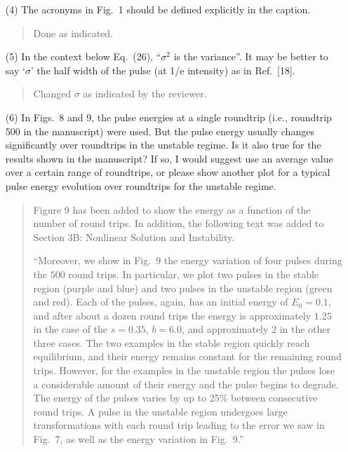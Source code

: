 \documentclass[12pt,twoside,letterpaper]{article}
\begin{document}
\begin{itemize}
    \item[{(4)}]
    The acronyms in Fig.~1 should be defined explicitly in the caption.

    \begin{quote}
        Done as indicated.
    \end{quote}

    \item[{(5)}]
    In the context below Eq.~(26), ``$\sigma^2$ is the variance''. It may be better to say `$\sigma$' the half width of the pulse (at 1/e intensity) as in  Ref.~[18].

    \begin{quote}
        Changed $\sigma$ as indicated by the reviewer.
    \end{quote}

    \item[{(6)}]
    In Figs.~8 and 9, the pulse energies at a single roundtrip (i.e., roundtrip 500 in the manuscript) were used. But the pulse energy usually changes significantly over roundtrips in the unstable regime. Is it also true for the results shown in the manuscript? If so, I would suggest use an average value over a certain range of roundtrips, or please show another plot for a typical pulse energy evolution over roundtrips for the unstable regime.

    \begin{quote}
        Figure 9 has been added to show the energy as a function of the number of round trips. In addition, the following text was added to Section 3B: Nonlinear Solution and Instability.

        \vspace{\baselineskip}

        ``Moreover, we show in Fig.~9 the energy variation of four pulses during the $500$ round trips. In particular, we plot two pulses in the stable region (purple and blue) and two pulses in the unstable region (green and red). Each of the pulses, again, has an initial energy of $E_0 = 0.1$, and after about a dozen round trips the energy is approximately $1.25$ in the case of the $s = 0.35$, $b = 6.0$, and approximately $2$ in the other three cases. The two examples in the stable region quickly reach equilibrium, and their energy remains constant for the remaining round trips. However, for the examples in the unstable region the pulses lose a considerable amount of their energy and the pulse begins to degrade. The energy of the pulses varies by up to 25\% between consecutive round trips. A pulse in the unstable region undergoes large transformations with each round trip leading to the error we saw in Fig.~7, as well as the energy variation in Fig.~9.''
    \end{quote}


\end{itemize}
\end{document}
